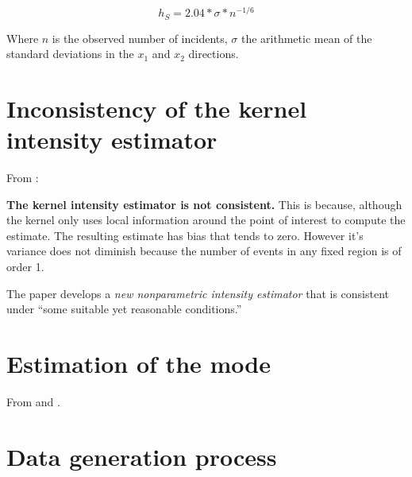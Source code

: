 \begin{equation}
\label{eq:silverman}
    h_S = 2.04 * \sigma * n^{-1/6}
\end{equation}

Where $n$ is the observed number of incidents,
$\sigma$ the arithmetic mean of the standard deviations in the $x_1$ and $x_2$ directions.



\section{Inconsistency of the kernel intensity estimator}
\label{sec:theory:inconsistency}

From \citet{guan2008consistent}:

{
\color{red}
\textbf{The kernel intensity estimator is not consistent.}
This is because, although the kernel only uses local information around the point of interest to compute the estimate.
The resulting estimate has bias that tends to zero.
However it's variance does not diminish because the number of events in any fixed region is of order 1.
}

The paper develops a \textit{new nonparametric intensity estimator} that is consistent under ``some suitable yet reasonable conditions.''

\section{Estimation of the mode}
\label{sec:theory:mode}

From \citet{bickel2006fast} and \citet{hedges2003comparison}.


\section{Data generation process}
\label{sec:theory:data}

